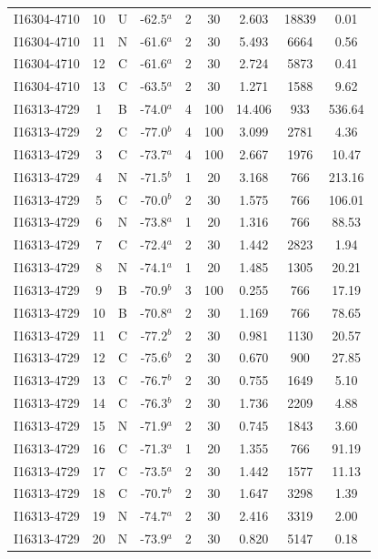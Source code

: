 \begin{table}
\begin{tabular}{ccccccccc}
I16304-4710 & 10 & U & -62.5$^{a}$ & 2 & 30 & 2.603 & 18839 & 0.01 \\
I16304-4710 & 11 & N & -61.6$^{a}$ & 2 & 30 & 5.493 & 6664 & 0.56 \\
I16304-4710 & 12 & C & -61.6$^{a}$ & 2 & 30 & 2.724 & 5873 & 0.41 \\
I16304-4710 & 13 & C & -63.5$^{a}$ & 2 & 30 & 1.271 & 1588 & 9.62 \\
I16313-4729 & 1 & B & -74.0$^{a}$ & 4 & 100 & 14.406 & 933 & 536.64 \\
I16313-4729 & 2 & C & -77.0$^{b}$ & 4 & 100 & 3.099 & 2781 & 4.36 \\
I16313-4729 & 3 & C & -73.7$^{a}$ & 4 & 100 & 2.667 & 1976 & 10.47 \\
I16313-4729 & 4 & N & -71.5$^{b}$ & 1 & 20 & 3.168 & 766 & 213.16 \\
I16313-4729 & 5 & C & -70.0$^{b}$ & 2 & 30 & 1.575 & 766 & 106.01 \\
I16313-4729 & 6 & N & -73.8$^{a}$ & 1 & 20 & 1.316 & 766 & 88.53 \\
I16313-4729 & 7 & C & -72.4$^{a}$ & 2 & 30 & 1.442 & 2823 & 1.94 \\
I16313-4729 & 8 & N & -74.1$^{a}$ & 1 & 20 & 1.485 & 1305 & 20.21 \\
I16313-4729 & 9 & B & -70.9$^{b}$ & 3 & 100 & 0.255 & 766 & 17.19 \\
I16313-4729 & 10 & B & -70.8$^{a}$ & 2 & 30 & 1.169 & 766 & 78.65 \\
I16313-4729 & 11 & C & -77.2$^{b}$ & 2 & 30 & 0.981 & 1130 & 20.57 \\
I16313-4729 & 12 & C & -75.6$^{b}$ & 2 & 30 & 0.670 & 900 & 27.85 \\
I16313-4729 & 13 & C & -76.7$^{b}$ & 2 & 30 & 0.755 & 1649 & 5.10 \\
I16313-4729 & 14 & C & -76.3$^{b}$ & 2 & 30 & 1.736 & 2209 & 4.88 \\
I16313-4729 & 15 & N & -71.9$^{a}$ & 2 & 30 & 0.745 & 1843 & 3.60 \\
I16313-4729 & 16 & C & -71.3$^{a}$ & 1 & 20 & 1.355 & 766 & 91.19 \\
I16313-4729 & 17 & C & -73.5$^{a}$ & 2 & 30 & 1.442 & 1577 & 11.13 \\
I16313-4729 & 18 & C & -70.7$^{b}$ & 2 & 30 & 1.647 & 3298 & 1.39 \\
I16313-4729 & 19 & N & -74.7$^{a}$ & 2 & 30 & 2.416 & 3319 & 2.00 \\
I16313-4729 & 20 & N & -73.9$^{a}$ & 2 & 30 & 0.820 & 5147 & 0.18 \\

\end{tabular}
\end{table}
